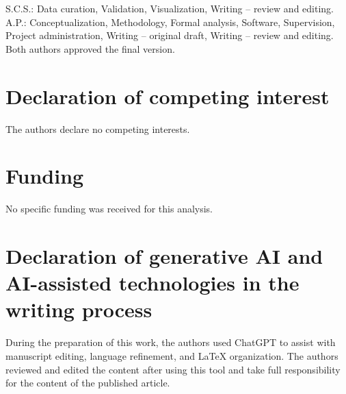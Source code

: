 \documentclass[preprint,12pt]{elsarticle}
\begin{document}
S.C.S.: Data curation, Validation, Visualization, Writing -- review and editing.
A.P.: Conceptualization, Methodology, Formal analysis, Software, Supervision,
Project administration, Writing -- original draft, Writing -- review and editing.
Both authors approved the final version.

\section*{Declaration of competing interest}

The authors declare no competing interests.

\section*{Funding}

No specific funding was received for this analysis.

\section*{Declaration of generative AI and AI-assisted technologies in the writing process}

During the preparation of this work, the authors used ChatGPT to assist with manuscript editing, language refinement, and LaTeX organization. The authors reviewed and edited the content after using this tool and take full responsibility for the content of the published article.



\end{document}
